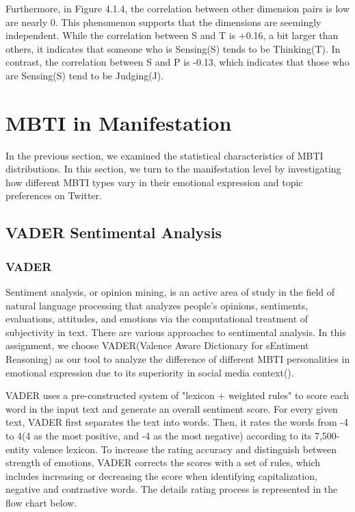 \documentclass[12pt]{article}
\begin{document}
	Furthermore, in Figure 4.1.4, the correlation between other dimension pairs is low are nearly 0. This phenomenon supports that the dimensions are seemingly independent. While the correlation between S and T is +0.16, a bit larger than others, it indicates that someone who is Sensing(S) tends to be Thinking(T). In contrast, the correlation between S and P is -0.13, which indicates that those who are Sensing(S) tend to be Judging(J).
	\section{MBTI in Manifestation} 
	In the previous section, we examined the statistical characteristics of MBTI distributions. In this section, we turn to the manifestation level by investigating how different MBTI types vary in their emotional expression and topic preferences on Twitter.
	
	
	\subsection{VADER Sentimental Analysis}
	\subsubsection{VADER}
	Sentiment analysis, or opinion mining, is an active area of study in the field of natural language processing that analyzes people's opinions, sentiments, evaluations, attitudes, and emotions via the computational treatment of subjectivity in text. There are various approaches to sentimental analysis. In this assignment, we choose VADER(Valence Aware Dictionary for sEntiment Reasoning) as our tool to analyze the difference of different MBTI personalities in emotional expression due to its superiority in social media context(\cite{VADER}).
	
	VADER uses a pre-constructed system of "lexicon + weighted rules" to score each word in the input text and generate an overall sentiment score. For every given text, VADER first separates the text into words. Then, it rates the words from -4 to 4(4 as the most positive, and -4 as the most negative) according to its 7,500-entity valence lexicon. To increase the rating accuracy and distinguish between strength of emotions, VADER corrects the scores with a set of rules, which includes increasing or decreasing the score when identifying capitalization, negative and contrastive words. The details rating process is represented in the flow chart below.
\end{document}
